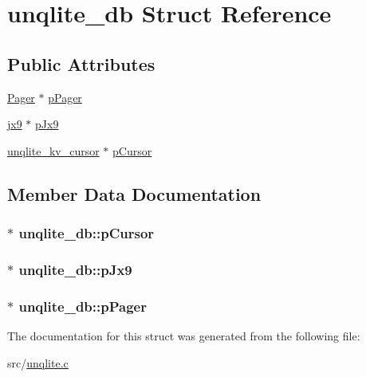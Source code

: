 \hypertarget{structunqlite__db}{\section{unqlite\-\_\-db Struct Reference}
\label{d7/ded/structunqlite__db}
}
\subsection*{Public Attributes}
\begin{DoxyCompactItemize}
\item 
\hyperlink{struct_pager}{Pager} $\ast$ \hyperlink{structunqlite__db_a2df999560e9de6dad36ab4032e74ce83}{p\-Pager}
\item 
\hyperlink{structjx9}{jx9} $\ast$ \hyperlink{structunqlite__db_ac1ec13c9ba8226867fa55fd8f3c765df}{p\-Jx9}
\item 
\hyperlink{structunqlite__kv__cursor}{unqlite\-\_\-kv\-\_\-cursor} $\ast$ \hyperlink{structunqlite__db_ac30cdfde9325d2226962b170a1af2855}{p\-Cursor}
\end{DoxyCompactItemize}


\subsection{Member Data Documentation}
\hypertarget{structunqlite__db_ac30cdfde9325d2226962b170a1af2855}{
\subsubsection[{p\-Cursor}]{$\ast$ unqlite\-\_\-db\-::p\-Cursor}}\label{d7/ded/structunqlite__db_ac30cdfde9325d2226962b170a1af2855}
\hypertarget{structunqlite__db_ac1ec13c9ba8226867fa55fd8f3c765df}{
\subsubsection[{p\-Jx9}]{$\ast$ unqlite\-\_\-db\-::p\-Jx9}}\label{d7/ded/structunqlite__db_ac1ec13c9ba8226867fa55fd8f3c765df}
\hypertarget{structunqlite__db_a2df999560e9de6dad36ab4032e74ce83}{
\subsubsection[{p\-Pager}]{$\ast$ unqlite\-\_\-db\-::p\-Pager}}\label{d7/ded/structunqlite__db_a2df999560e9de6dad36ab4032e74ce83}


The documentation for this struct was generated from the following file\-:\begin{DoxyCompactItemize}
\item 
src/\hyperlink{unqlite_8c}{unqlite.\-c}\end{DoxyCompactItemize}
